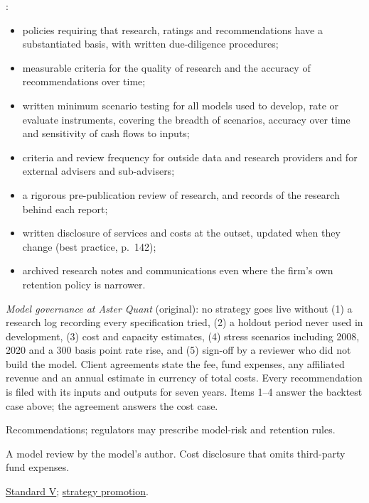 \begin{qfmethod}\label{meth:preventing-analysis-violations}
 \citep[pp.~133--134, 146, 154]{standards-practice-handbook-2024}:
\begin{itemize}
\item policies requiring that research, ratings and recommendations have a substantiated basis, with written due-diligence procedures;
\item measurable criteria for the quality of research and the accuracy of recommendations over time;
\item written minimum scenario testing for all models used to develop, rate or evaluate instruments, covering the breadth of scenarios, accuracy over time and sensitivity of cash flows to inputs;
\item criteria and review frequency for outside data and research providers and for external advisers and sub-advisers;
\item a rigorous pre-publication review of research, and records of the research behind each report;
\item written disclosure of services and costs at the outset, updated when they change (best practice, p.~142);
\item archived research notes and communications even where the firm's own retention policy is narrower.
\end{itemize}

 \emph{Model governance at Aster Quant} (original): no strategy goes live without (1) a research log recording every specification tried, (2) a holdout period never used in development, (3) cost and capacity estimates, (4) stress scenarios including 2008, 2020 and a 300 basis point rate rise, and (5) sign-off by a reviewer who did not build the model. Client agreements state the fee, fund expenses, any affiliated revenue and an annual estimate in currency of total costs. Every recommendation is filed with its inputs and outputs for seven years. Items 1--4 answer the backtest case above; the agreement answers the cost case.

 Recommendations; regulators may prescribe model-risk and retention rules.

 A model review by the model's author. Cost disclosure that omits third-party fund expenses.

 \hyperref[rule:standard-investment-analysis]{Standard V}; \hyperref[meth:strategy-promotion-criteria]{strategy promotion}.

\end{qfmethod}

